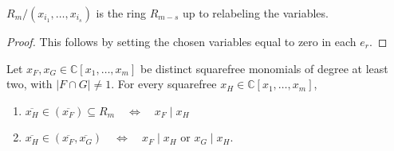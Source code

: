 \begin{lemma}
\label{lem:quotient-and-annihilators}
\(R_m/(x_{i_1},\dots,x_{i_s})\) is the ring \(R_{m-s}\) up to relabeling the variables.
\end{lemma}

\begin{proof}
This follows by setting the chosen variables equal to zero in each
\(e_r\).  
\end{proof}

\begin{lemma}
\label{lem:contraction}
Let \(x_F,x_G\in \mathbb{C}[x_1,\ldots,x_m]\) be distinct squarefree monomials of degree at least two, with \(|F\cap G|\neq1\).  
For every squarefree \(x_H\in \mathbb{C}[x_1,\ldots,x_m]\),
\begin{enumerate}
    \item $ \overline{x_H}\in(\overline{x_F})\subseteq R_m
 \quad\Longleftrightarrow\quad
 x_F\mid x_H$
 \item $\overline{x_H}\in(\overline{x_F},\overline{x_G})  \quad\Longleftrightarrow\quad  x_F\mid x_H$ or $x_G\mid x_H.$
\end{enumerate}

\end{lemma}

